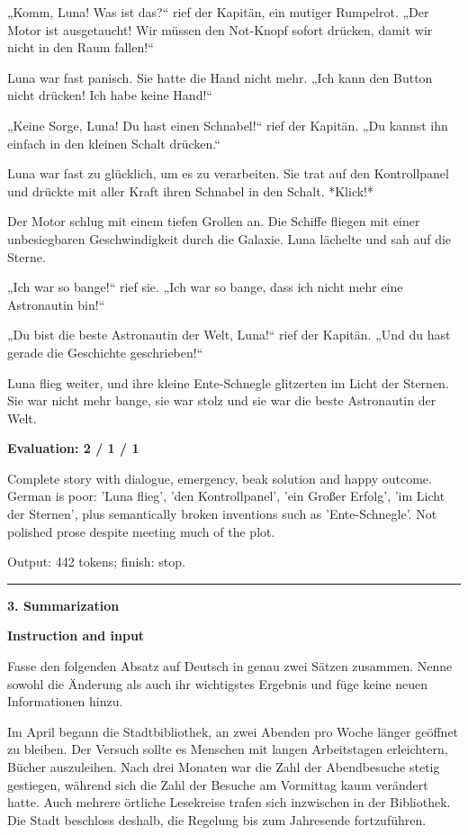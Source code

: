 \documentclass[10pt]{article}
\begin{document}
{\begin{minipage}{\textwidth}
„Komm, Luna! Was ist das?“ rief der Kapitän, ein mutiger Rumpelrot. „Der Motor ist ausgetaucht! Wir müssen den Not-Knopf sofort drücken, damit wir nicht in den Raum fallen!“
\par\smallskip
Luna war fast panisch. Sie hatte die Hand nicht mehr. „Ich kann den Button nicht drücken! Ich habe keine Hand!“
\par\smallskip
„Keine Sorge, Luna! Du hast einen Schnabel!“ rief der Kapitän. „Du kannst ihn einfach in den kleinen Schalt drücken.“
\par\smallskip
Luna war fast zu glücklich, um es zu verarbeiten. Sie trat auf den Kontrollpanel und drückte mit aller Kraft ihren Schnabel in den Schalt. *Klick!*
\par\smallskip
Der Motor schlug mit einem tiefen Grollen an. Die Schiffe fliegen mit einer unbesiegbaren Geschwindigkeit durch die Galaxie. Luna lächelte und sah auf die Sterne.
\par\smallskip
„Ich war so bange!“ rief sie. „Ich war so bange, dass ich nicht mehr eine Astronautin bin!“
\par\smallskip
„Du bist die beste Astronautin der Welt, Luna!“ rief der Kapitän. „Und du hast gerade die Geschichte geschrieben!“
\par\smallskip
Luna flieg weiter, und ihre kleine Ente-Schnegle glitzerten im Licht der Sternen. Sie war nicht mehr bange, sie war stolz und sie war die beste Astronautin der Welt.\par\smallskip
\textbf{Evaluation: 2 / 1 / 1}\par Complete story with dialogue, emergency, beak solution and happy outcome. German is poor: 'Luna flieg', 'den Kontrollpanel', 'ein Großer Erfolg', 'im Licht der Sternen', plus semantically broken inventions such as 'Ente-Schnegle'. Not polished prose despite meeting much of the plot.
\par {\color{gray} Output: 442 tokens; finish: stop.}\par
\medskip\hrule\smallskip
{\bfseries 3. Summarization}\par\smallskip
\textbf{Instruction and input}\par Fasse den folgenden Absatz auf Deutsch in genau zwei Sätzen zusammen. Nenne sowohl die Änderung als auch ihr wichtigstes Ergebnis und füge keine neuen Informationen hinzu.
\par\smallskip
Im April begann die Stadtbibliothek, an zwei Abenden pro Woche länger geöffnet zu bleiben. Der Versuch sollte es Menschen mit langen Arbeitstagen erleichtern, Bücher auszuleihen. Nach drei Monaten war die Zahl der Abendbesuche stetig gestiegen, während sich die Zahl der Besuche am Vormittag kaum verändert hatte. Auch mehrere örtliche Lesekreise trafen sich inzwischen in der Bibliothek. Die Stadt beschloss deshalb, die Regelung bis zum Jahresende fortzuführen.\par\smallskip

\end{minipage}}
\end{document}
